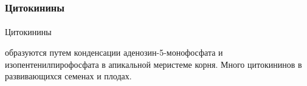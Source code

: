 \begin{figure}[h]
\begin{minipage}[h]{0.49\linewidth}
\end{minipage}
\hfill
\begin{minipage}[h]{0.49\linewidth}
\end{minipage}
\label{growth_stimulators}
\end{figure}


\subsubsection*{Цитокинины}
\paragraph*{}\hypertarget{citokin}{Цитокинины} образуются путем конденсации аденозин-5-монофосфата и изопентенилпирофосфата в апикальной меристеме корня. Много цитокининов в развивающихся семенах и плодах. 
